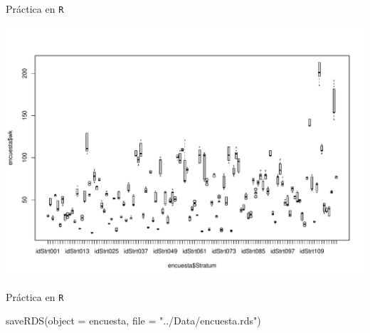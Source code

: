 \documentclass[
  english,
  ignorenonframetext,
]{beamer}
\newenvironment{Shaded}{\begin{snugshade}}{\end{snugshade}}
\newcommand{\AttributeTok}[1]{\textcolor[rgb]{0.77,0.63,0.00}{#1}}
\newcommand{\FunctionTok}[1]{\textcolor[rgb]{0.00,0.00,0.00}{#1}}
\newcommand{\NormalTok}[1]{#1}
\newcommand{\SpecialCharTok}[1]{\textcolor[rgb]{0.00,0.00,0.00}{#1}}
\newcommand{\StringTok}[1]{\textcolor[rgb]{0.31,0.60,0.02}{#1}}
\begin{document}
\begin{frame}[fragile]{Práctica en \texttt{R}}
\protect\hypertarget{pruxe1ctica-en-r-15}{}
\begin{Shaded}
\end{Shaded}

\includegraphics{0muestra_files/figure-beamer/unnamed-chunk-16-1.pdf}
\end{frame}

\begin{frame}[fragile]{Práctica en \texttt{R}}
\protect\hypertarget{pruxe1ctica-en-r-16}{}
\begin{Shaded}
\begin{Highlighting}[]
\FunctionTok{saveRDS}\NormalTok{(}\AttributeTok{object =}\NormalTok{ encuesta, }\AttributeTok{file =} \StringTok{"../Data/encuesta.rds"}\NormalTok{)}
\end{Highlighting}
\end{Shaded}
\end{frame}
\end{document}
